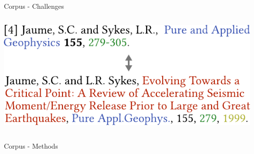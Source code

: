 \documentclass[en,16:9,smallfoot]{sdqbeamer}
\begin{document}
\begin{frame}{Corpus - Challenges}
\begin{columns}
          \vspace{3em}
          \includegraphics[width=0.9\linewidth]{imgs/hardmatch_examples}
   \end{columns}
   \end{frame}

   \begin{frame}{Corpus - Methods}
    \centering
   \end{frame}
\end{document}

